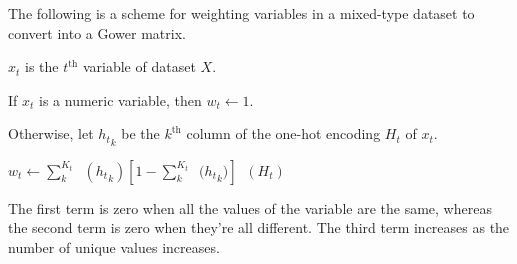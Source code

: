 \documentclass[11pt]{article}
\DeclareMathOperator{\Var}{\widehat{Var}}
\DeclareMathOperator{\Kurt}{\widehat{Kurt}}
\begin{document}
    The following is a scheme for weighting variables in a mixed-type dataset to convert into a Gower
    matrix.

    $x_t$ is the $t^{\text{th}}$ variable of dataset $X$.

    If $x_t$ is a numeric variable, then $w_t\leftarrow1$.

    Otherwise, let ${h_t}_k$ be the $k^{\text{th}}$ column of the one-hot encoding $H_t$ of $x_t$.

    $w_t\leftarrow\sum_k^{K_t}{\Var({h_t}_k)}\left[1-\sum_k^{K_t}{\Var({h_t}_k})\right]\Kurt(H_t)$

    The first term is zero when all the values of the variable are the same, whereas the second term is zero when
    they're all different. The third term increases as the number of unique values increases.
\end{document}
